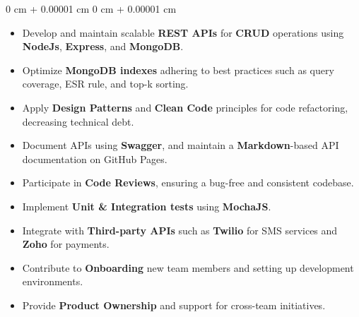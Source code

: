 \documentclass[10pt, letterpaper]{article}
\newenvironment{highlights}{
    \begin{itemize}[
        topsep=0.10 cm,
        parsep=0.10 cm,
        partopsep=0pt,
        itemsep=0pt,
        leftmargin=0 cm + 10pt
    ]
}{
    \end{itemize}
} %
\newenvironment{onecolentry}{
    \begin{adjustwidth}{
        0 cm + 0.00001 cm
    }{
        0 cm + 0.00001 cm
    }
}{
    \end{adjustwidth}
} %
\begin{document}
        \vspace{0.1 cm}
        \begin{onecolentry}
            \begin{highlights}
                \item Develop and maintain scalable \textbf{REST APIs} for \textbf{CRUD} operations using \textbf{NodeJs}, \textbf{Express}, and \textbf{MongoDB}.
                \item Optimize \textbf{MongoDB indexes} adhering to best practices such as query coverage, ESR rule, and top-k sorting.
                \item Apply \textbf{Design Patterns} and \textbf{Clean Code} principles for code refactoring, decreasing technical debt.
                \item Document APIs using \textbf{Swagger}, and maintain a \textbf{Markdown}-based API documentation on GitHub Pages.
                \item Participate in \textbf{Code Reviews}, ensuring a bug-free and consistent codebase.
                \item Implement \textbf{Unit \& Integration tests} using \textbf{MochaJS}.
                \item Integrate with \textbf{Third-party APIs} such as \textbf{Twilio} for SMS services and \textbf{Zoho} for payments.
                \item Contribute to \textbf{Onboarding} new team members and setting up development environments.
                \item Provide \textbf{Product Ownership} and support for cross-team initiatives.
                

\end{highlights}
\end{onecolentry}
\end{document}
